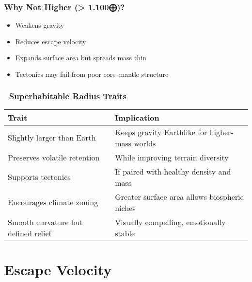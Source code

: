 \documentclass[
  letterpaper,
]{book}
\providecommand{\tightlist}{%
  \setlength{\itemsep}{0pt}\setlength{\parskip}{0pt}}
\begin{document}
\subsection{Why Not Higher (\textgreater{}
1.100⨁)?}\label{why-not-higher-1.100}

\begin{itemize}
\tightlist
\item
  Weakens gravity
\item
  Reduces escape velocity
\item
  Expands surface area but spreads mass thin
\item
  Tectonics may fail from poor core--mantle structure
\end{itemize}

\subsection{🧠 Superhabitable Radius
Traits}\label{superhabitable-radius-traits}

\begin{longtable}[]{@{}
  >{\raggedright\arraybackslash}p{}
  >{\raggedright\arraybackslash}p{}@{}}
\toprule\noalign{}
\begin{minipage}[b]{\linewidth}\raggedright
Trait
\end{minipage} & \begin{minipage}[b]{\linewidth}\raggedright
Implication
\end{minipage} \\
\midrule\noalign{}
\endhead
\bottomrule\noalign{}
\endlastfoot
Slightly larger than Earth & Keeps gravity Earthlike for higher-mass
worlds \\
Preserves volatile retention & While improving terrain diversity \\
Supports tectonics & If paired with healthy density and mass \\
Encourages climate zoning & Greater surface area allows biospheric
niches \\
Smooth curvature but defined relief & Visually compelling, emotionally
stable \\
\end{longtable}

\chapter{Escape Velocity}\label{escape-velocity}
\end{document}
